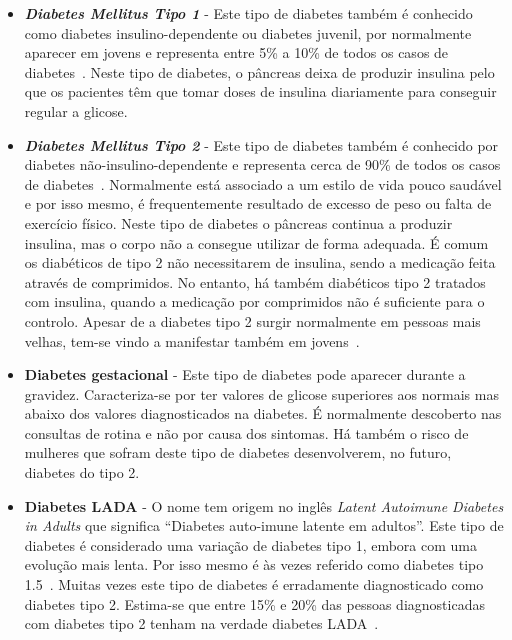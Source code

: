 \begin{itemize}
\item \textit{\textbf{Diabetes Mellitus Tipo 1}} - 
Este tipo de diabetes também é conhecido como diabetes insulino-dependente ou diabetes juvenil, por normalmente aparecer em jovens e representa entre 5\% a 10\% de todos os casos de diabetes~\cite{epidem}.
Neste tipo de diabetes, o pâncreas deixa de produzir insulina pelo que os pacientes têm que tomar doses de insulina diariamente para conseguir regular a glicose.

\item \textit{\textbf{Diabetes Mellitus Tipo 2}} - 
Este tipo de diabetes também é conhecido por diabetes não-insulino-dependente e representa cerca de 90\% de todos os casos de diabetes~\cite{type2}. Normalmente está associado a um estilo de vida pouco saudável e por isso mesmo, é frequentemente resultado de excesso de peso ou falta de exercício físico. 
Neste tipo de diabetes o pâncreas continua a produzir insulina, mas o corpo não a consegue utilizar de forma adequada.  É comum os diabéticos de tipo 2 não necessitarem de insulina, sendo a medicação feita através de comprimidos. No entanto, há também diabéticos tipo 2 tratados com insulina, quando a medicação por comprimidos não é suficiente para o controlo. Apesar de a diabetes tipo 2 surgir normalmente em pessoas mais velhas, tem-se vindo a manifestar também em jovens~\cite{youth}.

\item {\textbf{Diabetes gestacional}} - 
Este tipo de diabetes pode aparecer durante a gravidez. Caracteriza-se por ter valores de glicose superiores aos normais mas abaixo dos valores diagnosticados na diabetes.
É normalmente descoberto nas consultas de rotina e não por causa dos sintomas. Há também o risco de mulheres que sofram deste tipo de diabetes desenvolverem, no futuro, diabetes do tipo 2.

\item {\textbf{Diabetes LADA}} - 
O nome tem origem no inglês \textit{Latent Autoimune Diabetes in Adults} que significa ``Diabetes auto-imune latente em adultos''. 
Este tipo de diabetes é considerado uma variação de diabetes tipo 1, embora com uma evolução mais lenta. Por isso mesmo é às vezes referido como diabetes tipo 1.5~\cite{type15}. Muitas vezes este tipo de diabetes é erradamente diagnosticado como diabetes tipo 2. Estima-se que entre 15\% e 20\% das pessoas diagnosticadas com diabetes tipo 2 tenham na verdade diabetes LADA~\cite{type15}.
\end{itemize}

